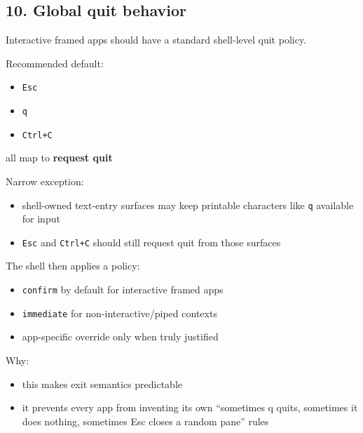 \subsection{10. Global quit behavior}\label{record-047-global-quit-behavior}

Interactive framed apps should have a standard shell-level quit policy.

Recommended default:

\begin{itemize}
\tightlist
\item
  \texttt{E\allowbreak{}s\allowbreak{}c}
\item
  \texttt{q}
\item
  \texttt{C\allowbreak{}t\allowbreak{}r\allowbreak{}l\allowbreak{}+\allowbreak{}C}
\end{itemize}

all map to \textbf{request quit}

Narrow exception:

\begin{itemize}
\tightlist
\item
  shell-owned text-entry surfaces may keep printable characters like \texttt{q} available for input
\item
  \texttt{E\allowbreak{}s\allowbreak{}c} and \texttt{C\allowbreak{}t\allowbreak{}r\allowbreak{}l\allowbreak{}+\allowbreak{}C} should still request quit from those surfaces
\end{itemize}

The shell then applies a policy:

\begin{itemize}
\tightlist
\item
  \texttt{c\allowbreak{}o\allowbreak{}n\allowbreak{}f\allowbreak{}i\allowbreak{}r\allowbreak{}m} by default for interactive framed apps
\item
  \texttt{i\allowbreak{}m\allowbreak{}m\allowbreak{}e\allowbreak{}d\allowbreak{}i\allowbreak{}a\allowbreak{}t\allowbreak{}e} for non-interactive/piped contexts
\item
  app-specific override only when truly justified
\end{itemize}

Why:

\begin{itemize}
\tightlist
\item
  this makes exit semantics predictable
\item
  it prevents every app from inventing its own ``sometimes q quits, sometimes it does nothing, sometimes Esc closes a random pane'' rules
\end{itemize}

